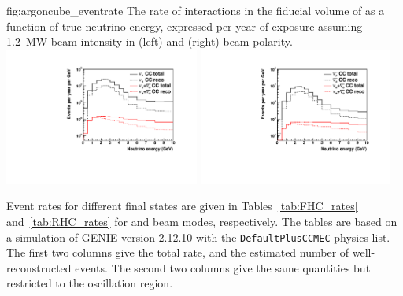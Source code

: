 \begin{dunefigure}{fig:argoncube_eventrate}
{The rate of  interactions in the fiducial volume of  as a function of true neutrino energy, expressed per year of exposure assuming \SI{1.2}{\mega\watt} beam intensity in  (left) and  (right) beam polarity.}
	\includegraphics[width=0.48\textwidth]{graphics/lartpc/event_rate_FHC.pdf}
	\includegraphics[width=0.48\textwidth]{graphics/lartpc/event_rate_RHC.pdf}
\end{dunefigure}

Event rates for different final states are given in Tables~\ref{tab:FHC_rates} and~\ref{tab:RHC_rates} for  and  beam modes, respectively. The tables are based on a simulation of GENIE version 2.12.10 with the \texttt{DefaultPlusCCMEC} physics list. The first two columns give the total rate, and the estimated number of well-reconstructed events. The second two columns give the same quantities but restricted to the oscillation region.

